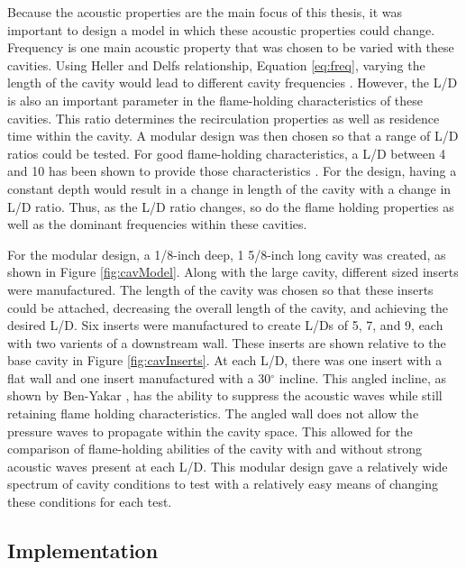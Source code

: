 Because the acoustic properties are the main focus of this thesis, it was important to design a model in which these acoustic properties could change. Frequency is one main acoustic property that was chosen to be varied with these cavities. Using Heller and Delfs relationship, Equation \ref{eq:freq}, varying the length of the cavity would lead to different cavity frequencies \cite{heller1996letter}. However, the L/D is also an important parameter in the flame-holding characteristics of these cavities. This ratio determines the recirculation properties as well as residence time within the cavity. A modular design was then chosen so that a range of L/D ratios could be tested. For good flame-holding characteristics, a L/D between 4 and 10 has been shown to provide those characteristics \cite{ben2001cavity}. For the design, having a constant depth would result in a change in length of the cavity with a change in L/D ratio. Thus, as the L/D ratio changes, so do the flame holding properties as well as the dominant frequencies within these cavities. 

For the modular design, a 1/8-inch deep, 1 5/8-inch long cavity was created, as shown in Figure \ref{fig:cavModel}. Along with the large cavity, different sized inserts were manufactured. The length of the cavity was chosen so that these inserts could be attached, decreasing the overall length of the cavity, and achieving the desired L/D. Six inserts were manufactured to create L/Ds of 5, 7, and 9, each with two varients of a downstream wall. These inserts are shown relative to the base cavity in Figure \ref{fig:cavInserts}. At each L/D, there was one insert with a flat wall and one insert manufactured with a 30$^\circ$ incline. This angled incline, as shown by Ben-Yakar \cite{ben2001cavity}, has the ability to suppress the acoustic waves while still retaining flame holding characteristics. The angled wall does not allow the pressure waves to propagate within the cavity space. This allowed for the comparison of flame-holding abilities of the cavity with and without strong acoustic waves present at each L/D. This modular design gave a relatively wide spectrum of cavity conditions to test with a relatively easy means of changing these conditions for each test. 

\subsection{Implementation}

